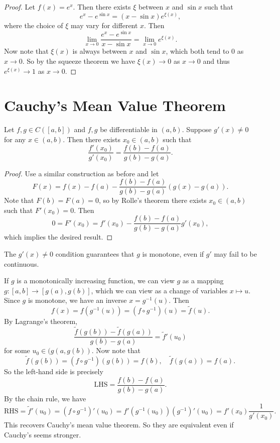 \begin{proof}
  Let $f(x) = e^x$. Then there exists $\xi$ between
  $x$ and $\sin x$ such that
  \[
    e^x - e^{\sin x} = (x - \sin x) e^{\xi(x)},
  \]
  where the choice of $\xi$ may vary for different $x$.
  Then
  \[
    \lim_{x \to 0} \frac{e^x - e^{\sin x}}{x - \sin x} = 
    \lim_{x \to 0} e^{\xi(x)}.
  \]
  Now note that $\xi(x)$ is always between $x$ and
  $\sin x$, which both tend to $0$ as $x \to 0$. So by
  the squeeze theorem we have $\xi(x) \to 0$ as $x \to 0$
  and thus $e^{\xi(x)} \to 1$ as $x \to 0$.
\end{proof}

\section{Cauchy's Mean Value Theorem}
\begin{theorem}
  Let $f, g \in C([a, b])$ and $f, g$ be differentiable
  in $(a, b)$. Suppose $g'(x) \ne 0$ for any
  $x \in (a, b)$. Then there exists $x_0 \in (a, b)$
  such that
  \[
    \frac{f'(x_0)}{g'(x_0)} = \frac{f(b) - f(a)}{g(b) - g(a)}.
  \]
\end{theorem}

\begin{proof}
  Use a similar construction as before and let
  \[
    F(x) = f(x) - f(a) - \frac{f(b) - f(a)}{g(b) - g(a)} (g(x) - g(a)).
  \]
  Note that $F(b) = F(a) = 0$, so by Rolle's theorem
  there exists $x_0 \in (a, b)$ such that
  $F'(x_0) = 0$. Then
  \[0 = F'(x_0) = f'(x_0) - \frac{f(b) - f(a)}{g(b) - g(a)} g'(x_0),\]
  which implies the desired result.
\end{proof}

\begin{remark}
  The $g'(x) \ne 0$ condition guarantees that
  $g$ is monotone, even if $g'$ may fail to be
  continuous.
\end{remark}

\begin{remark}
  If $g$ is a monotonically increasing function,
  we can view $g$ as a mapping
  $g : [a, b] \to [g(a), g(b)]$, which we can view
  as a change of variables $x \mapsto u$. Since $g$ is
  monotone, we have an inverse $x = g^{-1}(u)$. Then
  \[f(x) = f(g^{-1}(u)) = (f \circ g^{-1})(u) = \widetilde{f}(u).\]
  By Lagrange's theorem,
  \[
  \frac{\widetilde{f}(g(b)) - \widetilde{f}(g(a))}{g(b) - g(a)}
    = \widetilde{f}'(u_0)
  \]
  for some $u_0 \in (g(a, g(b))$. Now note that
  \[
    \widetilde{f}(g(b)) = (f \circ g^{-1})(g(b)) = f(b),
    \quad \widetilde{f}(g(a)) = f(a).
  \]
  So the left-hand side is precisely
  \[
    \text{LHS} = \frac{f(b) - f(a)}{g(b) - g(a)}.
  \]
  By the chain rule, we have
  \[
    \text{RHS} = \widetilde{f}'(u_0) = (f \circ g^{-1})'(u_0)
    = f'(g^{-1}(u_0)) (g^{-1})'(u_0)
    = f'(x_0) \frac{1}{g'(x_0)}.
  \]
  This recovers Cauchy's mean value theorem. So they are
  equivalent even if Cauchy's seems stronger.
\end{remark}
